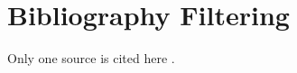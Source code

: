 \documentclass[a4paper,12pt]{report}
\begin{document}
\chapter{Bibliography Filtering}
Only one source is cited here \cite{referenced_source}.
\bibliographyChapter
\end{document}
